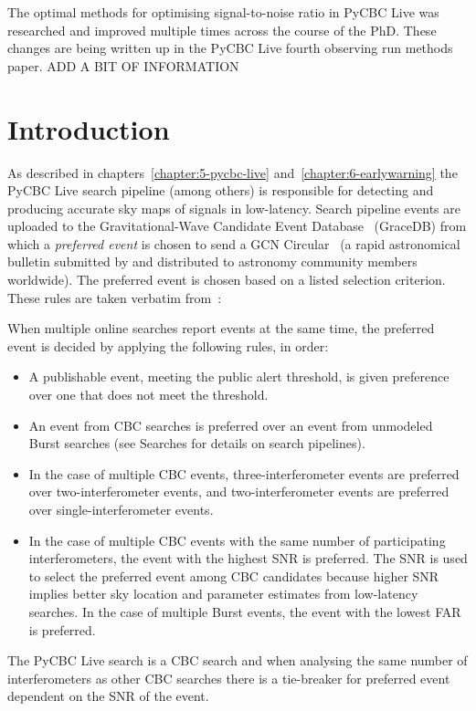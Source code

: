 
The optimal methods for optimising signal-to-noise ratio in PyCBC Live was researched and improved multiple times across the course of the PhD. These changes are being written up in the PyCBC Live fourth observing run methods paper. ADD A BIT OF INFORMATION

\section{\label{7:sec:introduction}Introduction}


As described in chapters~\ref{chapter:5-pycbc-live} and~\ref{chapter:6-earlywarning} the PyCBC Live search pipeline (among others) is responsible for detecting and producing accurate sky maps of \gwadj signals in low-latency. Search pipeline events are uploaded to the Gravitational-Wave Candidate Event Database~\cite{ligo_gracedb:2024} (GraceDB) from which a \textit{preferred event} is chosen to send a GCN Circular~\cite{gcn_circulars:2024} (a rapid astronomical bulletin submitted by and distributed to astronomy community members worldwide). The preferred event is chosen based on a listed selection criterion. These rules are taken verbatim from~\cite{gracedb_superevent_selection}:

When multiple online searches report events at the same time, the preferred event is decided by applying the following rules, in order:
%
\begin{itemize}
    \item A publishable event, meeting the public alert threshold, is given preference over one that does not meet the threshold.
    \item An event from CBC searches is preferred over an event from unmodeled Burst searches (see Searches for details on search pipelines).
    \item In the case of multiple CBC events, three-interferometer events are preferred over two-interferometer events, and two-interferometer events are preferred over single-interferometer events.
    \item In the case of multiple CBC events with the same number of participating interferometers, the event with the highest SNR is preferred. The SNR is used to select the preferred event among CBC candidates because higher SNR implies better sky location and parameter estimates from low-latency searches. In the case of multiple Burst events, the event with the lowest FAR is preferred.
\end{itemize}
%
The PyCBC Live search is a CBC search and when analysing the same number of interferometers as other CBC searches there is a tie-breaker for preferred event dependent on the SNR of the event.

